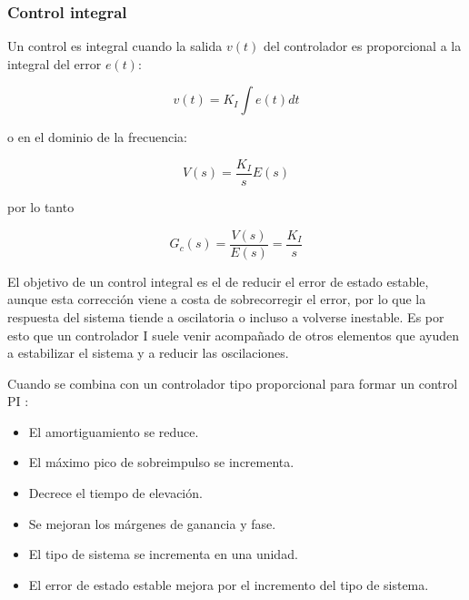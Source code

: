 %
%


\subsubsection{Control integral}%
\label{sec:control-i}
Un control es integral cuando la salida $v(t)$ del controlador es proporcional a la integral del error $e(t)$:

\begin{equation*}
v(t) = K_{I} \int e(t) dt
\end{equation*}

\noindent o en el dominio de la frecuencia:

\begin{equation*}
V(s) = \frac{K_I}{s} E(s)
\end{equation*}

\noindent por lo tanto

\begin{equation}
G_{c}(s) = \frac{V(s)}{E(s)} = \frac{K_I}{s}
\label{eqn:ctrl-i}
\end{equation}

El objetivo de un control integral es el de reducir el error de estado estable, aunque esta corrección viene a costa de sobrecorregir el error, por lo que la respuesta del sistema tiende a oscilatoria o incluso a volverse inestable.
Es por esto que un controlador I suele venir acompañado de otros elementos que ayuden a estabilizar el sistema y a reducir las oscilaciones.

Cuando se combina con un controlador tipo proporcional para formar un control PI :
\begin{itemize}[noitemsep]
	\item El amortiguamiento se reduce.
	\item El máximo pico de sobreimpulso se incrementa.
	\item Decrece el tiempo de elevación.
	\item Se mejoran los márgenes de ganancia y fase.
	\item El tipo de sistema se incrementa en una unidad.
	\item El error de estado estable mejora por el incremento del tipo de sistema.
\end{itemize}

